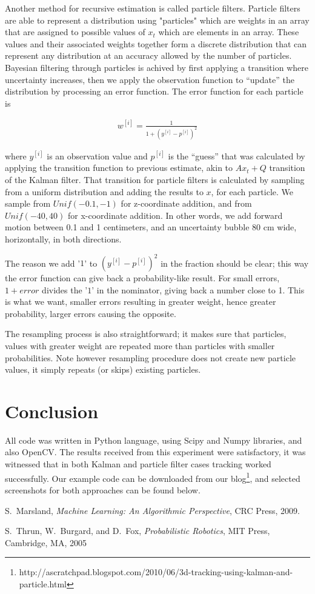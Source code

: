 Another method for recursive estimation is called particle filters. Particle
filters are able to represent a distribution using "particles" which are weights
in an array that are assigned to possible values of $x_t$ which are elements in
an array. These values and their associated weights together form a discrete
distribution that can represent any distribution at an accuracy allowed by the
number of particles. Bayesian filtering through particles is achived by first
applying a transition where uncertainty increases, then we apply the observation
function to ``update'' the distribution by processing an error function. The
error function for each particle is

\begin{eqnarray*}
w^{[i]}=\frac{1}{1 + (y^{[i]}-p^{[i]})^2}
\end{eqnarray*}

where $y^{[i]}$ is an observation value and $p^{[i]}$ is the ``guess'' that was
calculated by applying the transition function to previous estimate, akin to
$Ax_t + Q$ transition of the Kalman filter. That transition for particle filters
is calculated by sampling from a uniform distribution and adding the results to
$x$, for each particle. We sample from $Unif(-0.1, -1)$ for z-coordinate
addition, and from $Unif(-40,40)$ for x-coordinate addition. In other words, we
add forward motion between 0.1 and 1 centimeters, and an uncertainty bubble 80
cm wide, horizontally, in both directions. 

The reason we add '$1$' to $(y^{[i]}-p^{[i]})^2$ in the fraction should be
clear; this way the error function can give back a probability-like result. For
small errors, $1+error$ divides the '$1$' in the nominator, giving back a number
close to 1. This is what we want, smaller errors resulting in greater weight,
hence greater probability, larger errors causing the opposite.

The resampling process is also straightforward; it makes sure that particles,
values with greater weight are repeated more than particles with smaller
probabilities. Note however resampling procedure does not create new particle
values, it simply repeats (or skips) existing particles.

\section{Conclusion}

All code was written in Python language, using Scipy and Numpy libraries, and
also OpenCV. The results received from this experiment were satisfactory, it was
witnessed that in both Kalman and particle filter cases tracking worked
successfully. Our example code can be downloaded from our
blog\footnote{http://ascratchpad.blogspot.com/2010/06/3d-tracking-using-kalman-and-particle.html},
and selected screenshots for both approaches can be found below.

\begin{thebibliography}{1}

S.~Marsland, \emph{Machine Learning: An Algorithmic Perspective}, CRC Press, 2009.

S.~Thrun, W.~Burgard, and D.~Fox, \emph{Probabilistic Robotics}, MIT Press, Cambridge, MA, 2005

\end{thebibliography}





